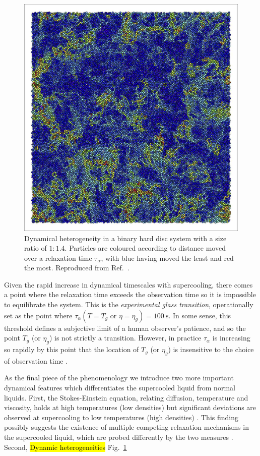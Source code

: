 \documentclass[11pt,twoside]{report}
\begin{document}
\begin{figure}
  \includegraphics[width=0.7\linewidth,outer]{dynamic-heterogeneity}
  \caption[Dynamical heterogeneity in binary hard discs]{
    Dynamical heterogeneity in a binary hard disc system with a size ratio of $1:1.4$.
    Particles are coloured according to distance moved over a relaxation time $\tau_\alpha$, with blue having moved the least and red the most.
    Reproduced from Ref.\ \cite{RoyallPR2015}.
  }
  \label{fig:dynamic-heterogeneities}
\end{figure}

Given the rapid increase in dynamical timescales with supercooling, there comes a point where the relaxation time exceeds the observation time so it is impossible to equilibrate the system.
This is the \emph{experimental glass transition}, operationally set as the point where $\tau_\alpha(T = T_g \textrm{ or } \eta = \eta_g) = \SI{100}{\second}$.
In some sense, this threshold defines a subjective limit of a human observer's patience, and so the point $T_g$ (or $\eta_g$) is not strictly a transition.
However, in practice $\tau_\alpha$ is increasing so rapidly by this point that the location of $T_g$ (or $\eta_g$) is insensitive to the choice of observation time \cite{CavagnaPR2009}.

As the final piece of the phenomenology we introduce two more important dynamical features which differentiates the supercooled liquid from normal liquids.
First, the Stokes-Einstein equation, relating diffusion, temperature and viscosity, holds at high temperatures (low densities) but significant deviations are observed at supercooling to low temperatures (high densities) \cite{BerthierRMP2011}.
This finding possibly suggests the existence of multiple competing relaxation mechanisms in the supercooled liquid, which are probed differently by the two measures \cite{EdigerARPC2000}.
Second, \hl{Dynamic heterogeneities} Fig.\ \ref{fig:dynamic-heterogeneities}
\end{document}
